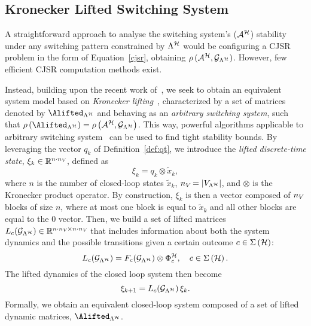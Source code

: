 \subsection{Kronecker Lifted Switching System}%
\label{sec:system_dynamics}
%
A straightforward approach to analyse the switching system's ($\mathcal{A}^{\mathcal{H}}$) stability under any switching pattern constrained by $\Lambda^{\mathcal{H}}$ would be configuring a CJSR problem in the form of Equation~\eqref{cjsr}, obtaining $\rho\,(\mathcal{A}^{\mathcal{H}},\mathcal{G}_{\Lambda^{\mathcal{H}}})$.
However, few efficient CJSR computation methods exist.

Instead, building upon the recent work of~\cite{xu2020approximation}, we seek to obtain an equivalent system model based on \emph{Kronecker lifting}~\cite{horn2012matrix}, characterized by a set of matrices denoted by $\Alifted_{\Lambda^\strat}$ and behaving as an \emph{arbitrary switching system}, such that $\rho\funof{\Alifted_{\Lambda^\strat}} = \rho\funof{\Aa^{\strat},\GG{\Lambda^\strat}}$.
This way, powerful algorithms applicable to arbitrary switching system~\cite{vankeerberghen2014jsr,sparsejsr} can be used to find tight stability bounds.
%
By leveraging the vector $q_k$ of Definition~\ref{def:qt}, we introduce the \emph{lifted discrete-time state}, $\xi_k\in\mathbb{R}^{n\cdot n_{V_{}}}$, defined as 
\begin{equation*}
    \xi_k = q_k\otimes \tilde x_k,
\end{equation*}
where $n$ is the number of closed-loop states $\tilde x_k$, $n_{V_{}} = \left|V_{\Lambda^{\mathcal{H}}}\right|$, and $\otimes$ is the Kronecker product operator.
By construction, $\xi_k$ is then a vector composed of $n_{V_{}}$ blocks of size $n$, where at most one block is equal to $\tilde x_k$ and all other blocks are equal to the $0$ vector.
%
Then, we build a set of lifted matrices $L_{c} ( \mathcal{G}_{\Lambda^{\mathcal{H}}} )\in\mathbb{R}^{n\cdot n_{V_{}}\times n\cdot n_{V_{}}}$ that includes information about both the system dynamics and the possible transitions given a certain outcome $c \in \Sigma\left(\mathcal{H}\right)$:
%
\begin{equation*}
    L_{c} ( \mathcal{G}_{\Lambda^{\mathcal{H}}} ) = F_{c} ( \mathcal{G}_{\Lambda^{\mathcal{H}}} )\otimes \Phi{}_c^{\mathcal{H}},\quad c \in \Sigma \left( \mathcal{H} \right).
\end{equation*}
%
The lifted dynamics of the closed loop system then become%
%
\begin{equation*}
    \xi_{k+1} = L_{c} ( \mathcal{G}_{\Lambda^{\mathcal{H}}} )\,\xi_k.
\end{equation*}
%
Formally, we obtain an equivalent closed-loop system composed of a set of lifted dynamic matrices, $\Alifted_{\Lambda^\strat}$.
